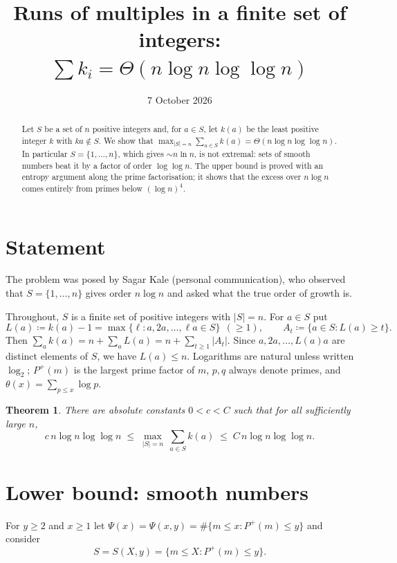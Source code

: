 \documentclass[11pt]{article}
\title{Runs of multiples in a finite set of integers:\\[2pt] $\sum k_i = \Theta(n \log n \log\log n)$}
\author{}
\date{7 October 2026}
\newtheorem{theorem}{Theorem}
\theoremstyle{remark}
\newcommand{\Pplus}{P^{+}}
\begin{document}
\maketitle

\begin{abstract}
Let $S$ be a set of $n$ positive integers and, for $a\in S$, let $k(a)$ be the least positive integer $k$ with $ka\notin S$.
We show that $\max_{|S|=n}\sum_{a\in S}k(a) = \Theta(n\log n\log\log n)$.
In particular $S=\{1,\dots,n\}$, which gives $\sim n\ln n$, is not extremal: sets of smooth numbers beat it by a factor of order $\log\log n$.
The upper bound is proved with an entropy argument along the prime factorisation; it shows that the excess over $n\log n$ comes entirely from primes below $(\log n)^4$.
\end{abstract}

\section{Statement}

The problem was posed by Sagar Kale (personal communication), who observed that $S=\{1,\dots,n\}$ gives order $n\log n$ and asked what the true order of growth is.

Throughout, $S$ is a finite set of positive integers with $|S|=n$.
For $a\in S$ put
\[
  L(a) \coloneqq k(a)-1 = \max\{\ell : a,2a,\dots,\ell a\in S\} \ \ (\ge 1),
  \qquad
  A_t \coloneqq \{a\in S : L(a)\ge t\}.
\]
Then $\sum_{a}k(a) = n+\sum_a L(a) = n + \sum_{t\ge1}|A_t|$.
Since $a,2a,\dots,L(a)a$ are distinct elements of $S$, we have $L(a)\le n$.
Logarithms are natural unless written $\log_2$; $\Pplus(m)$ is the largest prime factor of $m$, $p,q$ always denote primes, and $\theta(x)=\sum_{p\le x}\log p$.

\begin{theorem}\label{thm:main}
There are absolute constants $0<c<C$ such that for all sufficiently large $n$,
\[
  c\, n\log n\log\log n \;\le\; \max_{|S|=n}\ \sum_{a\in S}k(a) \;\le\; C\, n\log n\log\log n .
\]
\end{theorem}

\section{Lower bound: smooth numbers}

For $y\ge 2$ and $x\ge1$ let $\Psi(x)=\Psi(x,y)=\#\{m\le x:\Pplus(m)\le y\}$ and consider
\[
  S = S(X,y) = \{m\le X : \Pplus(m)\le y\}.
\]
\end{document}
